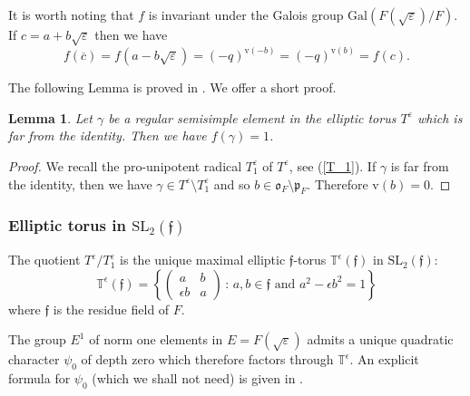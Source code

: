 \documentclass[11pt]{amsart}
\numberwithin{equation}{section}
\newtheorem{lem}[equation]{Lemma}
\def\kF{\mathfrak{f}}
\def\g{\mathbf{g}}
\def\fo{\mathfrak{o}}
\def\fp{\mathfrak{p}}
\def\fe{\mathfrak{e}}
\def\Gal{\mathrm{Gal}}
\def\val{\mathrm{v}}
\def\SL{\mathrm{SL}}
\def\bbT{\mathbb{T}}
\def\fo{\mathfrak{o}}
\def\fp{\mathfrak{p}}
\def\g{\mathbf{g}}
\newcommand{\<}{\left\langle}
\renewcommand{\>}{\right\rangle}
\begin{document}
It is worth noting that $f$ is invariant under the Galois group $\Gal(F(\sqrt \varepsilon)/F)$.  If $c = a + b\sqrt \varepsilon$ then we have
\begin{equation}
f(\overline{c}) = f(a - b\sqrt \varepsilon) = (-q)^{\val(-b)} = (-q)^{\val(b)} = f(c).
\end{equation}\label{fGalois}

The following Lemma is proved in \cite[p.65]{ADSS}.    We offer a short proof.

\begin{lem}\label{farfrom}  Let $\gamma$ be a regular semisimple element 
in the elliptic torus $T^\varepsilon$ which is far from the identity.   Then we have $f(\gamma) = 1$.
\end{lem}
\begin{proof} We recall the pro-unipotent radical $T^\varepsilon_1$ of $T^\varepsilon$, see (\ref{T_1}).  If $\gamma$ is far from the identity, then we have 
$\gamma \in T^\varepsilon \setminus T^\varepsilon_1$ and so $b \in \fo_F \setminus \fp_F$.  Therefore $\val(b) = 0$. 
\end{proof}


\subsubsection{Elliptic torus in $\SL_2(\kF)$}   The quotient $T^\varepsilon/T_1^\varepsilon$ is the unique maximal elliptic $\kF$-torus $\bbT^\epsilon(\kF)$ in $\SL_2(\kF)$:
\begin{equation}
\bbT^\epsilon (\kF)=\left\{ \left(\begin{matrix}
   a & b\\
 \epsilon b & a
 \end{matrix}
 \right)\,:\, \text{$a,b\in \kF$ and $a^2-\epsilon b^2=1$}\right\}
 \end{equation} 
 where $\kF$ is the residue field of $F$.   

  
The group $E^1$ of norm one elements in $E = F(\sqrt \varepsilon)$ admits a unique quadratic character $\psi_0$ of depth zero which therefore factors through $\bbT^\epsilon$.  
An explicit formula for $\psi_0$ (which we shall not need) is given in \cite[\S 9.2]{ADSS}.   

   
\end{document}
